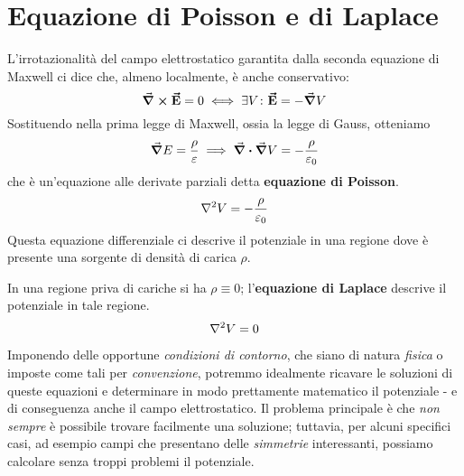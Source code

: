 \section{Equazione di Poisson e di Laplace}
L'irrotazionalità del campo elettrostatico garantita dalla seconda equazione di Maxwell ci dice che, almeno localmente, è anche conservativo:
\begin{equation*}
	\curl{\vb*{\va{E}}}=0\iff \exists V\colon \vb*{\va{E}}=-\grad{V}
\end{equation*}
Sostituendo nella prima legge di Maxwell, ossia la legge di Gauss, otteniamo
\begin{equation*}
	\grad{E}=\frac{\rho}{\varepsilon}\implies\div{\grad{V}}=-\frac{\rho}{\varepsilon_0}
\end{equation*}
che è un'equazione alle derivate parziali detta \textbf{equazione di Poisson}.
\begin{equation}
	\laplacian{V}=-\frac{\rho}{\epsilon_0}
\end{equation}
Questa equazione differenziale ci descrive il potenziale in una regione dove è presente una sorgente di densità di carica $\rho$.

In una regione priva di cariche si ha $\rho\equiv0$; l'\textbf{equazione di Laplace} descrive il potenziale in tale regione.
\begin{equation}
	\laplacian{V}=0
\end{equation}

Imponendo delle opportune \textit{condizioni di contorno}, che siano di natura \textit{fisica} o imposte come tali per \textit{convenzione}, potremmo idealmente ricavare le soluzioni di queste equazioni e determinare in modo prettamente matematico il potenziale - e di conseguenza anche il campo elettrostatico. Il problema principale è che \textit{non sempre} è possibile trovare facilmente una soluzione; tuttavia, per alcuni specifici casi, ad esempio campi che presentano delle \textit{simmetrie} interessanti, possiamo calcolare senza troppi problemi il potenziale.

